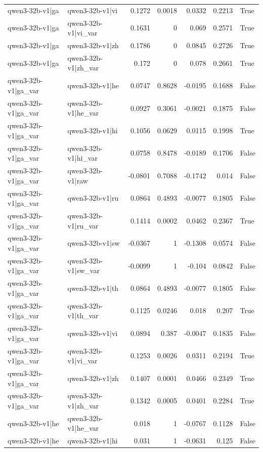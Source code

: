 \begin{table}
\begin{tabular}{l l r r r r l}
qwen3-32b-v1|ga & qwen3-32b-v1|vi & 0.1272 & 0.0018 & 0.0332 & 0.2213 & True \\
qwen3-32b-v1|ga & qwen3-32b-v1|vi_var & 0.1631 & 0 & 0.069 & 0.2571 & True \\
qwen3-32b-v1|ga & qwen3-32b-v1|zh & 0.1786 & 0 & 0.0845 & 0.2726 & True \\
qwen3-32b-v1|ga & qwen3-32b-v1|zh_var & 0.172 & 0 & 0.078 & 0.2661 & True \\
qwen3-32b-v1|ga_var & qwen3-32b-v1|he & 0.0747 & 0.8628 & -0.0195 & 0.1688 & False \\
qwen3-32b-v1|ga_var & qwen3-32b-v1|he_var & 0.0927 & 0.3061 & -0.0021 & 0.1875 & False \\
qwen3-32b-v1|ga_var & qwen3-32b-v1|hi & 0.1056 & 0.0629 & 0.0115 & 0.1998 & True \\
qwen3-32b-v1|ga_var & qwen3-32b-v1|hi_var & 0.0758 & 0.8478 & -0.0189 & 0.1706 & False \\
qwen3-32b-v1|ga_var & qwen3-32b-v1|raw & -0.0801 & 0.7088 & -0.1742 & 0.014 & False \\
qwen3-32b-v1|ga_var & qwen3-32b-v1|ru & 0.0864 & 0.4893 & -0.0077 & 0.1805 & False \\
qwen3-32b-v1|ga_var & qwen3-32b-v1|ru_var & 0.1414 & 0.0002 & 0.0462 & 0.2367 & True \\
qwen3-32b-v1|ga_var & qwen3-32b-v1|sw & -0.0367 & 1 & -0.1308 & 0.0574 & False \\
qwen3-32b-v1|ga_var & qwen3-32b-v1|sw_var & -0.0099 & 1 & -0.104 & 0.0842 & False \\
qwen3-32b-v1|ga_var & qwen3-32b-v1|th & 0.0864 & 0.4893 & -0.0077 & 0.1805 & False \\
qwen3-32b-v1|ga_var & qwen3-32b-v1|th_var & 0.1125 & 0.0246 & 0.018 & 0.207 & True \\
qwen3-32b-v1|ga_var & qwen3-32b-v1|vi & 0.0894 & 0.387 & -0.0047 & 0.1835 & False \\
qwen3-32b-v1|ga_var & qwen3-32b-v1|vi_var & 0.1253 & 0.0026 & 0.0311 & 0.2194 & True \\
qwen3-32b-v1|ga_var & qwen3-32b-v1|zh & 0.1407 & 0.0001 & 0.0466 & 0.2349 & True \\
qwen3-32b-v1|ga_var & qwen3-32b-v1|zh_var & 0.1342 & 0.0005 & 0.0401 & 0.2284 & True \\
qwen3-32b-v1|he & qwen3-32b-v1|he_var & 0.018 & 1 & -0.0767 & 0.1128 & False \\
qwen3-32b-v1|he & qwen3-32b-v1|hi & 0.031 & 1 & -0.0631 & 0.125 & False \\

\end{tabular}
\end{table}
